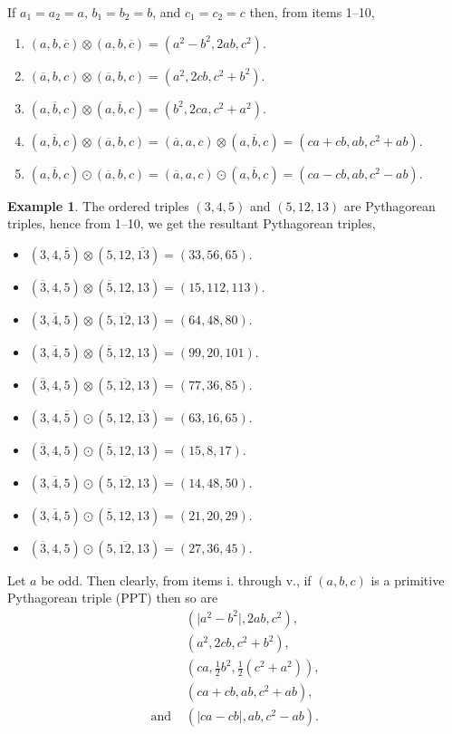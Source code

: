 \documentclass{article}
\renewcommand{\labelenumi}{\roman{enumi}.}
\theoremstyle{definition}
\newtheorem{example}{Example}[section]
\begin{document}
\bigskip

If \(a_1=a_2=a\), \(b_1=b_2=b\), and \(c_1=c_2=c\) then, from items 1--10,
\renewcommand{\labelenumi}{\roman{enumi}.}
\begin{enumerate}
\item \((a,b,\overline{c}) \otimes (a,b,\overline{c}) = (a^2-b^2, 2ab, c^2)\).
\item \((\overline{a},b,c) \otimes (\overline{a},b,c) = (a^2, 2cb, c^2+b^2)\).
\item \((a,\overline{b},c) \otimes (a,\overline{b},c) = (b^2, 2ca, c^2+a^2)\).
\item \((a,\overline{b},c) \otimes (\overline{a},b,c) = (\overline{a},a,c) \otimes (a,\overline{b},c) = (ca+cb, ab, c^2+ab)\).
\item \((a,\overline{b},c) \odot (\overline{a},b,c) = (\overline{a},a,c) \odot (a,\overline{b},c) = (ca-cb, ab, c^2-ab)\).
\end{enumerate}

\begin{example}
The ordered triples \((3,4,5)\) and \((5,12,13)\) are Pythagorean triples, hence from 1--10, we get the resultant Pythagorean triples,
\begin{itemize}
\item \((3,4,\overline{5}) \otimes (5,12,\overline{13}) = (33,56,65)\).
\item \((\overline{3},4,5) \otimes (\overline{5},12,13) = (15,112,113)\).
\item \((3,\overline{4},5) \otimes (5,\overline{12},13) = (64,48,80)\).
\item \((3,\overline{4},5) \otimes (\overline{5},12,13) = (99,20,101)\).
\item \((\overline{3},4,5) \otimes (5,\overline{12},13) = (77,36,85)\).
\item \((3,4,\overline{5}) \odot (5,12,\overline{13}) = (63,16,65)\).
\item \((\overline{3},4,5) \odot (\overline{5},12,13) = (15,8,17)\).
\item \((3,\overline{4},5) \odot (5,\overline{12},13) = (14,48,50)\).
\item \((3,\overline{4},5) \odot (\overline{5},12,13) = (21,20,29)\).
\item \((\overline{3},4,5) \odot (5,\overline{12},13) = (27,36,45)\).
\end{itemize}
\end{example}

Let \(a\) be odd. Then clearly, from items i. through v., if \((a,b,c)\) is a primitive Pythagorean triple (PPT) then so are \[\begin{aligned}
&(\lvert a^2-b^2\rvert, 2ab, c^2), \\ &(a^2, 2cb, c^2 + b^2), \\ &(ca, \tfrac{1}{2}b^2, \tfrac{1}{2}(c^2+a^2)), \\ &(ca+cb, ab, c^2+ab), \\ \text{and } &(\lvert ca-cb\rvert, ab, c^2-ab).
\end{aligned}\]
\end{document}
